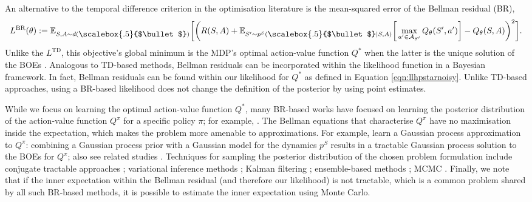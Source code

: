 \documentclass{amsart}
\renewcommand{\cdot}[1][.5]{%
  \mathbin{\vcenter{\hbox{\scalebox{#1}{$\bullet$}}}}%
}
\begin{document}
 An alternative to the temporal difference criterion in the optimisation literature is the mean-squared error of the Bellman residual (BR), 
$$ L^{\mathrm{BR}}(\theta) := \mathbb{E}_{S,A \sim d(\cdot)}\bigg[\bigg(R(S,A)+ \mathbb{E}_{S^\prime \sim p^S(\cdot|S,A)}\bigg[\max_{a^\prime \in \mathcal{A}_{S^\prime}} Q_\theta(S^\prime,a^\prime)\bigg]-Q_\theta(S,A)\bigg)^2\bigg].$$
Unlike the $L^{\mathrm{TD}}$, this objective's global minimum is the MDP's optimal action-value function $Q^*$ when the latter is the unique solution of the BOEs \citep{residualgradient_baird1995,lstdlinear,  policyevaluationsurvey}. Analogous to TD-based methods, Bellman residuals can be incorporated within the likelihood function in a Bayesian framework. In fact, Bellman residuals can be found within our likelihood for $Q^*$ as defined in Equation \ref{eqn:llhpstarnoisy}. Unlike TD-based approaches, using a BR-based likelihood does not change the definition of the posterior by using point estimates.

While we focus on learning the optimal action-value function $Q^\ast$, many BR-based works have focused on learning the posterior distribution of the action-value function $Q^\pi$ for a specific policy $\pi$; for example, \citet{gprl-rasmussen, gpsarsa_engel, kalmantd, singh_whitney_chopin_acm, bayesianbellmanoperator, sellandsingh}. The Bellman equations that characterise $Q^\pi$ have no maximisation inside the expectation, which makes the problem more amenable to approximations. For example, \citet{gprl-rasmussen} learn a Gaussian process approximation to $Q^\pi$: combining a Gaussian process prior with a Gaussian model for the dynamics $p^S$ results in a tractable Gaussian process solution to the BOEs for $Q^\pi$; also see related studies \citep{gpsarsa_engel, kalmantd}. Techniques for sampling the posterior distribution of the chosen problem formulation include conjugate tractable approaches \citep{tsdeardenbayesq,gprl-rasmussen,gpsarsa_engel,psrl-ssp}; variational inference methods \citep{dropout,bdqn_azizz}; Kalman filtering \citep{kalmantd}; ensemble-based methods \citep{bootstraposband,randomisedpriorwithensembleosband,randomisedvaluefunction,  tdsmc}; MCMC \citep{sellandsingh,qlearn_sgld}. Finally, we note that if the inner expectation within the Bellman residual (and therefore our likelihood) is not tractable, which is a common problem shared by all such BR-based methods, it is possible to estimate the inner expectation using Monte Carlo.
\end{document}
